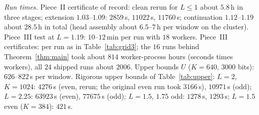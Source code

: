 \documentclass[11pt]{amsart}
\theoremstyle{definition}
\theoremstyle{remark}
\numberwithin{equation}{section}
\begin{document}
\emph{Run times.} Piece~II certificate of record: clean rerun for $L\le1$ about $5.8$\,h in three stages; extension $1.03$--$1.09$: $2859$\,s, $11022$\,s, $11760$\,s; continuation $1.12$--$1.19$ about $28.5$\,h in total (head assembly about $6.5$--$7$\,h per window on the cluster). Piece~III test at $L=1.19$: $10$--$12$\,min per run with $18$ workers. Piece~III certificates: per run as in Table~\ref{tab:grid3}; the $16$ runs behind Theorem~\ref{thm:main} took about $814$ worker-process hours (seconds times workers), all $24$ shipped runs about $2006$. Upper bounds $U$ ($K=640$, $3000$ bits): $626$--$822$\,s per window. Rigorous upper bounds of Table~\ref{tab:upper}: $L=2$, $K=1024$: $4276$\,s (even, rerun; the original even run took $3166$\,s), $10971$\,s (odd); $L=2.25$: $63923$\,s (even), $77675$\,s (odd); $L=1.5$, $1.75$ odd: $1278$\,s, $1293$\,s; $L=1.5$ even ($K=384$): $421$\,s.
\end{document}
